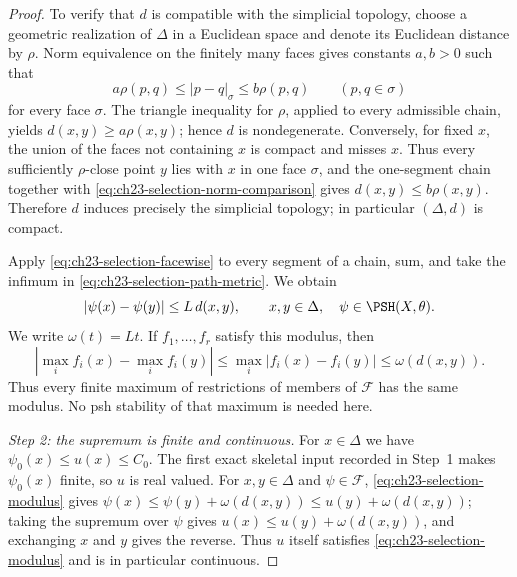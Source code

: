 \begin{proof}
To verify that \(d\) is compatible with the simplicial topology, choose a
geometric realization of \(\Delta\) in a Euclidean space and denote its
Euclidean distance by \(\rho\).  Norm equivalence on the finitely many faces
gives constants \(a,b>0\) such that
\begin{equation}\label{eq:ch23-selection-norm-comparison}
 a\rho(p,q)\leq |p-q|_\sigma\leq b\rho(p,q)
 \qquad(p,q\in\sigma)
\end{equation}
for every face \(\sigma\).  The triangle inequality for \(\rho\), applied to
every admissible chain, yields \(d(x,y)\geq a\rho(x,y)\); hence \(d\) is
nondegenerate.  Conversely, for fixed \(x\), the union of the faces not
containing \(x\) is compact and misses \(x\).  Thus every sufficiently
\(\rho\)-close point \(y\) lies with \(x\) in one face \(\sigma\), and the
one-segment chain together with \eqref{eq:ch23-selection-norm-comparison}
gives \(d(x,y)\leq b\rho(x,y)\).  Therefore \(d\) induces precisely the
simplicial topology; in particular \((\Delta,d)\) is compact.

Apply \eqref{eq:ch23-selection-facewise} to every segment of a chain, sum,
and take the infimum in \eqref{eq:ch23-selection-path-metric}.  We obtain
\begin{equation}\label{eq:ch23-selection-modulus}
 |\psi(x)-\psi(y)|\leq L\,d(x,y),
 \qquad x,y\in\Delta,
 \quad \psi\in\PSH(X,\theta).
\end{equation}
We write \(\omega(t)=Lt\).  If \(f_1,\ldots,f_r\) satisfy this modulus, then
\[
 |\max_i f_i(x)-\max_i f_i(y)|
 \leq\max_i|f_i(x)-f_i(y)|
 \leq\omega(d(x,y)).
\]
Thus every finite maximum of restrictions of members of \(\mathcal F\) has
the same modulus.  No psh stability of that maximum is needed here.

\emph{Step 2: the supremum is finite and continuous.}
For \(x\in\Delta\) we have
\(\psi_0(x)\leq u(x)\leq C_0\).  The first exact skeletal input recorded in
Step~1 makes \(\psi_0(x)\) finite, so \(u\) is real valued.  For
\(x,y\in\Delta\) and \(\psi\in\mathcal F\),
\eqref{eq:ch23-selection-modulus} gives
\(\psi(x)\leq\psi(y)+\omega(d(x,y))\leq u(y)+\omega(d(x,y))\); taking the
supremum over \(\psi\) gives \(u(x)\leq u(y)+\omega(d(x,y))\), and
exchanging \(x\) and \(y\) gives the reverse.  Thus \(u\) itself satisfies
\eqref{eq:ch23-selection-modulus} and is in particular continuous.


\end{proof}
